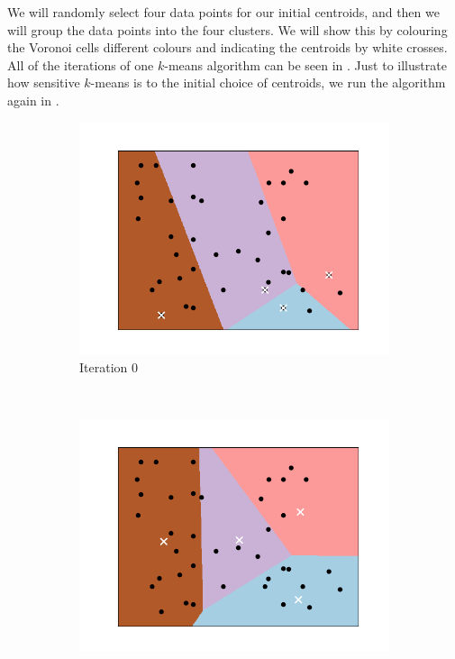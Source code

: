 \documentclass[a4paper, 12pt]{article}
\numberwithin{equation}{section}
\numberwithin{figure}{section}
\theoremstyle{definition}
\begin{document}
We will randomly select four data points for our initial centroids, and then we
will group the data points into the four clusters. We will show this by
colouring the Voronoi cells different colours and indicating the centroids by
white crosses. All of the iterations of one $k$-means algorithm can be seen in
. Just to illustrate how sensitive $k$-means is to
the initial choice of centroids, we run the algorithm again in
.

\afterpage{\clearpage}

\begin{figure}[ht]
	\centering 
	\begin{subfigure}[b]{0.49\textwidth}
		\centering 
		\includegraphics[scale=0.4]{graphics/k_means_iter0.png}
		\vspace{-0.75em}
		\caption{Iteration 0}
	\end{subfigure}~%
	\begin{subfigure}[b]{0.49\textwidth}
		\centering 
		\includegraphics[scale=0.4]{graphics/k_means_iter1.png}

\end{subfigure}
\end{figure}
\end{document}
